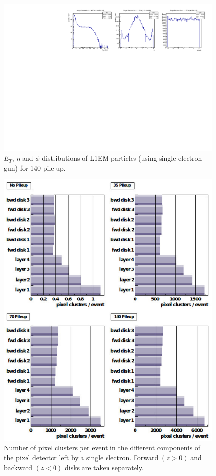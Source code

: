 \begin{figure}[!htb]
  \centering
  \includegraphics[scale=0.8]{../SimulationTools/L1EM_EtEtaPhi_140PileUP.pdf}
  \caption{$E_{T}$, $\eta$ and $\phi$ distributions of L1EM particles (using single electron-gun) for 140 pile up.}
  \label{}
\end{figure}

\begin{figure}[!htb]
  \centering
  \includegraphics[scale=0.7]{../SimulationTools/Number_of_pixel_clusters.pdf}
  \caption{Number of pixel clusters per event in the different components of the pixel detector left by a single electron.
    Forward $(z>0)$ and backward $(z<0)$ disks are taken separately.}
  \label{}
\end{figure}
